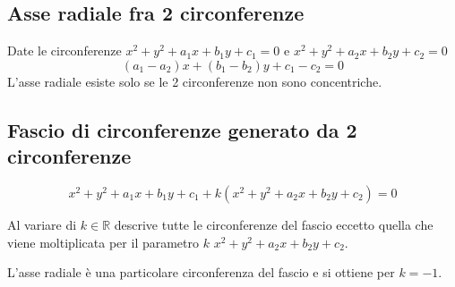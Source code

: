 \documentclass{article}
\begin{document}
  \subsection*{Asse radiale fra 2 circonferenze}
  Date le circonferenze $x^2+y^2+a_1x+b_1y+c_1 = 0$ e $x^2+y^2+a_2x+b_2y+c_2 = 0$ 
  \begin{equation}
    (a_1-a_2)x+(b_1-b_2)y+c_1-c_2 = 0
  \end{equation}
  L'asse radiale esiste solo se le 2 circonferenze non sono concentriche.

  \subsection*{Fascio di circonferenze generato da 2 circonferenze}
  \begin{equation}
    x^2+y^2+a_1x+b_1y+c_1 +k (x^2+y^2+a_2x+b_2y+c_2) = 0
  \end{equation}

  Al variare di $k \in \mathbb{R}$ descrive tutte le circonferenze del fascio eccetto quella che viene moltiplicata per il parametro $k$ $x^2+y^2+a_2x+b_2y+c_2$.

  L'asse radiale è una particolare circonferenza del fascio e si ottiene per $k=-1$.
\end{document}
